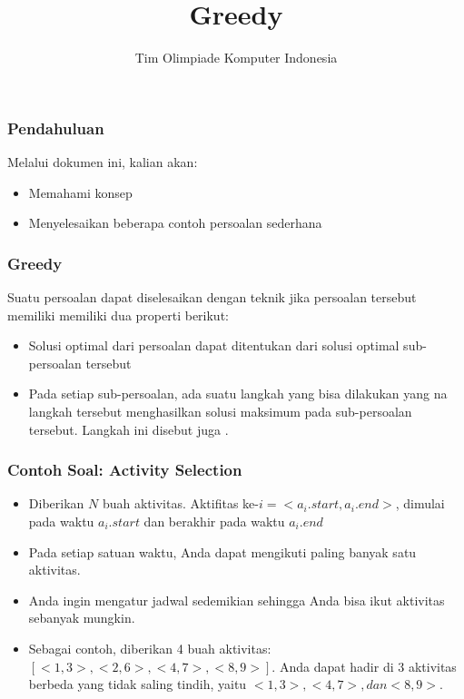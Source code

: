 

\title{Greedy}
\author{Tim Olimpiade Komputer Indonesia}
\date{}



\begin{frame}
	\titlepage
\end{frame}

\begin{frame}
	\frametitle{Pendahuluan}
	Melalui dokumen ini, kalian akan:
	\begin{itemize}
		\item Memahami konsep 
		\item Menyelesaikan beberapa contoh persoalan  sederhana
	\end{itemize}
\end{frame}
	
\begin{frame}
	\frametitle{Greedy}
	Suatu persoalan dapat diselesaikan dengan teknik  jika persoalan tersebut memiliki memiliki dua properti berikut:
	\begin{itemize}

		\item Solusi optimal dari persoalan dapat ditentukan dari solusi optimal sub-persoalan tersebut
		\item Pada setiap sub-persoalan, ada suatu langkah yang bisa dilakukan yang na langkah tersebut menghasilkan solusi maksimum pada sub-persoalan tersebut. Langkah ini disebut juga . 
	\end{itemize}
\end{frame}

\begin{frame}
	\frametitle{Contoh Soal: Activity Selection}
	\begin{itemize}
		\item Diberikan $N$ buah aktivitas. Aktifitas ke-$i = <a_i.start, a_i.end>$,  dimulai pada waktu $a_i.start$ dan berakhir pada waktu $a_i.end$
		\item Pada setiap satuan waktu, Anda dapat mengikuti paling banyak satu aktivitas.
		\item Anda ingin mengatur jadwal sedemikian sehingga Anda bisa ikut aktivitas sebanyak mungkin.
		\item Sebagai contoh, diberikan 4 buah aktivitas: $[ <1, 3> , <2, 6>, <4, 7>,  <8, 9> ]$. Anda dapat hadir di 3 aktivitas berbeda yang tidak saling tindih, yaitu $<1, 3>, <4, 7>, dan <8, 9>$. 
	\end{itemize}
\end{frame}



